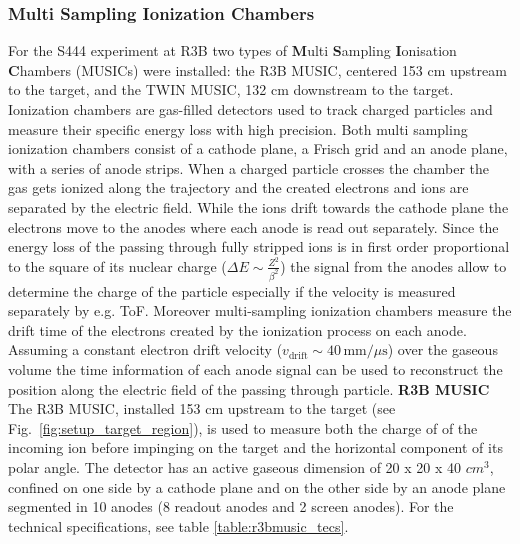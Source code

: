 \subsubsection{Multi Sampling Ionization Chambers}\label{sec:ionisation_chambers}
For the S444 experiment at R3B two types of \textbf{M}ulti \textbf{S}ampling \textbf{I}onisation \textbf{C}hambers (MUSICs) were installed: the R3B MUSIC, centered 153 cm upstream to the target, and the TWIN MUSIC, 132 cm downstream to the target. Ionization chambers are gas-filled detectors used to track charged particles and measure their specific energy loss with high precision. Both multi sampling ionization chambers consist of a cathode plane, a Frisch grid  and an anode plane, with a series of anode strips. When a charged particle crosses the chamber the gas gets ionized along the trajectory and the created electrons and ions are separated by the electric field. While the ions drift towards the cathode plane the electrons move to the anodes where each anode is read out separately. Since the energy loss of the passing through fully stripped ions is in first order proportional to the square of its nuclear charge ($\Delta E \sim \frac{Z^2}{\beta^2}$) the signal from the anodes allow to determine the charge of the particle especially if the velocity is measured separately by e.g. ToF. Moreover multi-sampling ionization chambers measure the drift time of the electrons created by the ionization process  on each anode. Assuming a constant electron drift velocity ($ v_{\text{drift}} \sim 40\,\text{mm}/\mu\text{s}$) over the gaseous volume the time information of each anode signal can be used to reconstruct the position along the electric field of the passing through particle.\newline
\textbf{R3B MUSIC}\newline
The R3B MUSIC, installed 153 cm upstream to the target (see Fig.~\ref{fig:setup_target_region}), is used to measure both the  charge of of the incoming ion before impinging on the target and the horizontal component of its polar angle. The detector has an active gaseous dimension of 20 x 20 x 40 $cm^3$, confined on one side by a cathode plane and on the other side by an anode plane segmented in 10 anodes (8 readout anodes and 2 screen anodes). For the technical specifications, see table \ref{table:r3bmusic_tecs}. \newline
